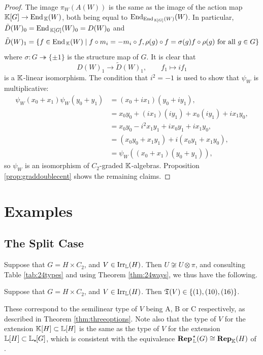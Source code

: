 \begin{proof}
    The image $\pi_W(A(W))$ is the same as the image of the action map ${\mathbb K}[G] \rightarrow \operatorname{End}_{\, {\mathbb K}}(W)$, both being equal to $\operatorname{End}_{\operatorname{End}_{\, {\mathbb K}[G]}(W)}(W)$. In particular, $\tilde{D}(W)_0 = \operatorname{End}_{\, {\mathbb K}[G]}(W)_0 = D(W)_0$ and 
    \[
        \tilde{D}(W)_1 = \{f \in \operatorname{End}_{\, {\mathbb K}}(W) \mid  f \circ m_i = - m_i \circ f, \rho(g) \circ f = \sigma(g) f \circ \rho(g) \text{ for all } g\in G \}
    \]
    where $\sigma \colon G \twoheadrightarrow \{\pm 1\}$ is the structure map of $G$. It is clear that
    \[
    D(W)_1 \rightarrow \tilde{D}(W)_1, \qquad f_1 \mapsto if_1
    \]
    is a ${\mathbb K}$-linear isomorphism. The condition that $i^2 = -1$ is used to show that $\psi_W$ is multiplicative:
    \begin{align*}
        \psi_W(x_0 + x_1)\psi_W(y_0 + y_1) &= (x_0 + i x_1)(y_0 + i y_1), \\
        &= x_0y_0 + (ix_1)(i y_1) + x_0 (iy_1) + ix_1y_0, \\
        &= x_0y_0 - i^2 x_1y_1 + i x_0y_1 + ix_1y_0, \\
        &= (x_0y_0 + x_1y_1) + i(x_0y_1 + x_1 y_0), \\
        &= \psi_W((x_0 + x_1)(y_0 + y_1)),
    \end{align*}
    so $\psi_W$ is an isomorphism of $C_2$-graded ${\mathbb K}$-algebras. Proposition \ref{prop:graddoublecent} shows the remaining claims.
\end{proof}

\section{Examples}

\subsection{The Split Case}

Suppose that $G = H \times C_2$, and $V \in \operatorname{Irr}_{{\mathbb L}}(H)$. Then $U \not\cong U \otimes \pi$, and consulting Table \ref{tab:24types} and using Theorem \ref{thm:24ways}, we thus have the following.

\begin{cor}
    Suppose that $G = H \times C_2$, and $V \in \operatorname{Irr}_{{\mathbb L}}(H)$. Then ${\mathfrak T}(V) \in \{(1), (10), (16)\}$.
\end{cor}

These correspond to the semilinear type of $V$ being A, B or C respectively, as described in Theorem \ref{thm:threeoptions}. Note also that the type of $V$ for the extension ${\mathbb K}[H] \subset {\mathbb L}[H]$ is the same as the type of $V$ for the extension ${\mathbb L}[H] \subset {\mathbb L}_{\star \hspace{-0.1em}}[G]$, which is consistent with the equivalence $\operatorname{\mathbf{Rep}}_{\, {\mathbb L}}^{\hspace{0.1em} \star}(G) \cong \operatorname{\mathbf{Rep}}_{{\mathbb K}}(H)$ of \cite[\S 6]{TAYSchur}.

